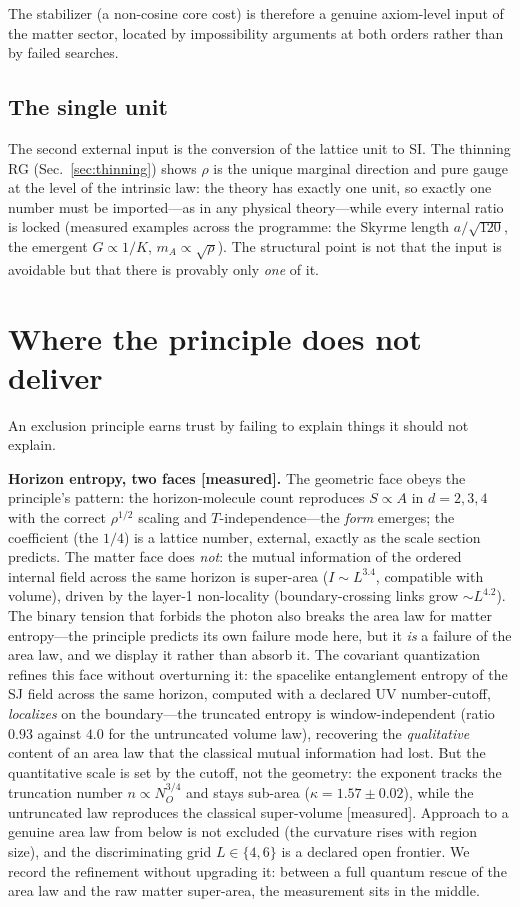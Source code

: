 \documentclass[aps,prd,reprint,nofootinbib,superscriptaddress,floatfix]{revtex4-2}
\theoremstyle{definition}
\begin{document}
The stabilizer (a non-cosine core cost) is therefore a genuine axiom-level input of the
matter sector, located by impossibility arguments at both orders rather than by failed
searches.

\subsection{The single unit}

The second external input is the conversion of the lattice unit to SI. The thinning RG
(Sec.~\ref{sec:thinning}) shows $\rho$ is the unique marginal direction and pure gauge
at the level of the intrinsic law: the theory has exactly one unit, so exactly one
number must be imported---as in any physical theory---while every internal ratio is
locked (measured examples across the programme: the Skyrme length $a/\sqrt{120}$, the
emergent $G\propto1/K$, $m_A\propto\sqrt\rho$). The structural point is not that the
input is avoidable but that there is provably only \emph{one} of it.

\section{Where the principle does not deliver}
\label{sec:vaccine}

An exclusion principle earns trust by failing to explain things it should not explain.

\textbf{Horizon entropy, two faces [measured].} The geometric face obeys the principle's
pattern: the horizon-molecule count reproduces $S\propto A$ in $d=2,3,4$ with the
correct $\rho^{1/2}$ scaling and $T$-independence---the \emph{form} emerges; the
coefficient (the $1/4$) is a lattice number, external, exactly as the scale section
predicts. The matter face does \emph{not}: the mutual information of the ordered
internal field across the same horizon is super-area ($I\sim L^{3.4}$, compatible with
volume), driven by the layer-1 non-locality (boundary-crossing links grow $\sim L^{4.2}$).
The binary tension that forbids the photon also breaks the area law for matter
entropy---the principle predicts its own failure mode here, but it \emph{is} a failure
of the area law, and we display it rather than absorb it. The covariant quantization
refines this face without overturning it: the spacelike entanglement entropy of the SJ
field across the same horizon, computed with a declared UV number-cutoff, \emph{localizes}
on the boundary---the truncated entropy is window-independent (ratio $0.93$ against $4.0$
for the untruncated volume law), recovering the \emph{qualitative} content of an area law
that the classical mutual information had lost. But the quantitative scale is set by the
cutoff, not the geometry: the exponent tracks the truncation number $n\propto N_O^{3/4}$
and stays sub-area ($\kappa=1.57\pm0.02$), while the untruncated law reproduces the
classical super-volume [measured]. Approach to a genuine area law from below is not
excluded (the curvature rises with region size), and the discriminating grid
$L\in\{4,6\}$ is a declared open frontier. We record the refinement without upgrading it:
between a full quantum rescue of the area law and the raw matter super-area, the
measurement sits in the middle.
\end{document}
